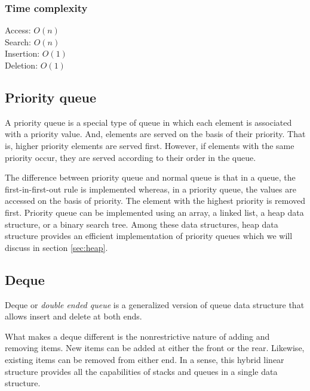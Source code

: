 \documentclass[a4paper,11pt]{book}
\begin{document}
\subsubsection{Time complexity}

\noindent Access: $O(n)$\\
\noindent Search: $O(n)$\\
\noindent Insertion: $O(1)$\\
\noindent Deletion: $O(1)$

\subsection{Priority queue}

\noindent A priority queue is a special type of queue in which each element is associated with a priority value. And, elements are served on the basis of their priority. That is, higher priority elements are served first. However, if elements with the same priority occur, they are served according to their order in the queue.

\noindent The difference between priority queue and normal queue is that in a queue, the first-in-first-out rule is implemented whereas, in a priority queue, the values are accessed on the basis of priority. The element with the highest priority is removed first. Priority queue can be implemented using an array, a linked list, a heap data structure, or a binary search tree. Among these data structures, heap data structure provides an efficient implementation of priority queues which we will discuss in section \ref{sec:heap}.

\subsection{Deque}
\noindent Deque or \textit{double ended queue} is a generalized version of queue data structure that allows insert and delete at both ends.

\noindent What makes a deque different is the nonrestrictive nature of adding and removing items. New items can be added at either the front or the rear. Likewise, existing items can be removed from either end. In a sense, this hybrid linear structure provides all the capabilities of stacks and queues in a single data structure.\\
\end{document}
